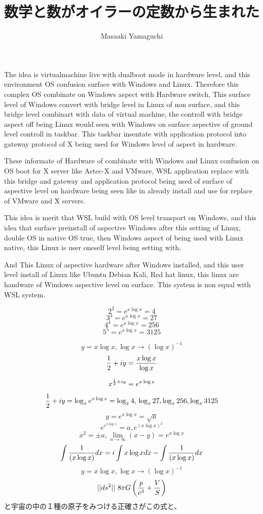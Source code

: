 \documentclass{jsarticle}
\begin{document}
       The idea is virtualmachine live with dualboot mode in hardware level,
   and this environment OS confusion surface with Windows and Linux.
   Therefore this complex OS combinate on Windows aspect with Hardware switch, 
   This surface level of Windows convert with bridge level in Linux of non
   surface, and this bridge level combinart with data of virtual machine,
   the controll with bridge aspect off being Linux would seen with
   Windows on surface aspective of ground level controll in taskbar.
   This taskbar insentate with application protocol into gateway protocol
   of X being used for Windows level of aspect in hardware.


        These informate of Hardware of combinate with Windows and Linux
   confusion on OS boot for X server like Astec-X and VMware,
   WSL application replace with this bridge and gateway and application
   protocol being used of surface of aspective level on hardware being seen
   like in already install and use for replace of VMware and X servers.



         This idea is merit that WSL build with OS level transport on Windows,
   and this idea that surface preinstall of aspective Windows after this
   setting of Linux, double OS in native OS true, then Windows aspect of
   being used with Linux native, this Linux is user oneself level
   being setting with.
   
   And This Linux of aspective hardware after Windows installed,
   and this user level install of Linux like Ubuntu Debian Kali, Red hat
   linux, this linux are handware of Windows aspective level on surface.
   This system is non equal with WSL system.


\newpage
\title{数学と数がオイラーの定数から生まれた　}
\author{Masaaki Yamaguchi}

   $$ 2^2 = e^{x \log x} = 4 $$
   $$ 3^3 = e^{x \log x} = 27 $$
   $$ 4^4 = e^{x \log x} = 256 $$
   $$ 5^5 = e^{x \log x} = 3125 $$


    $$ y = x \log x, \log x \to (\log x)^{-1}  $$
    $$ {1 \over 2} + iy = {{x \log x} \over \log x}$$


   $$ x^{{1 \over 2} + iy} = e^{x \log x} $$
   $$ {1 \over 2} + iy = \log_{x}e^{x \log x} = \log_{x} 4, \\
   \log_{x} 27, \log_{x} 256, \log_{x} 3125 $$
   $$ y = e^{x \log x} = \sqrt{a} $$
   $$ e^{e^{x \log x}} = a, e^{(x\log x)^2} $$
   $$ x^2 = \pm a, \lim_{n \to \infty} (x - y) = e^{x \log x} $$
   $$ \int {1 \over (x \log x)}dx = i \int x \log x dx 
   - \int {1 \over (x \log x)}dx $$
   $$ y = x \log x, \log x \to (\log x)^{-1}  $$
   $$ ||ds^2|| ~ 8 \pi G\left({p \over c^3} + {V \over S}\right)$$
   と宇宙の中の１種の原子をみつける正確さがこの式と、
\end{document}
